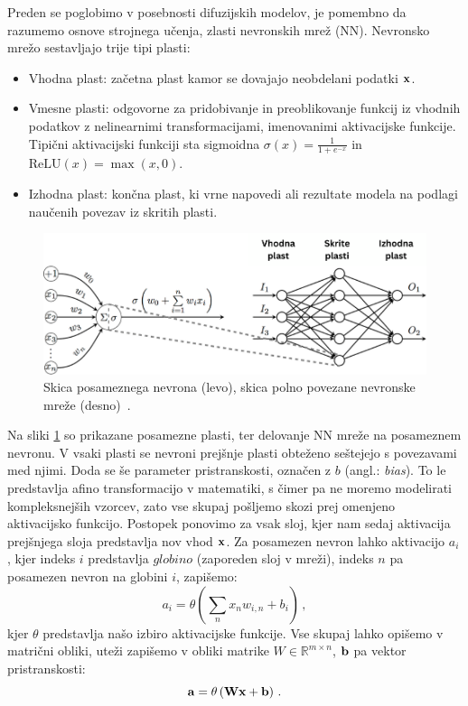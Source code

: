 \documentclass[12pt, a4paper]{article}
\begin{document}
Preden se poglobimo v posebnosti difuzijskih modelov, je pomembno da razumemo osnove strojnega učenja, zlasti nevronskih mrež (NN). Nevronsko mrežo sestavljajo trije tipi plasti:
\begin{itemize}
    \item Vhodna plast: začetna plast kamor se dovajajo neobdelani podatki $\bf{x}$.
    
    \item Vmesne plasti: odgovorne za pridobivanje in preoblikovanje funkcij iz vhodnih podatkov z nelinearnimi transformacijami, imenovanimi aktivacijske funkcije. Tipični aktivacijski funkciji sta sigmoidna $\sigma(x) = \frac{1}{1 + e^{-x}}$ in $\text{ReLU}(x) = \max({x, 0})$.
    
    \item Izhodna plast: končna plast, ki vrne napovedi ali rezultate modela na podlagi naučenih povezav iz skritih plasti.
\end{itemize}

\begin{figure}[htb!]
        \centering
        \includegraphics[width=0.8\linewidth]{Images_SLO/Neural Network_SLO.png}
        \caption{Skica posameznega nevrona (levo), skica polno povezane nevronske mreže (desno)~\cite{PetarV}.}
        \label{fig:NN}
\end{figure}

Na sliki \ref{fig:NN} so prikazane posamezne plasti, ter delovanje NN mreže na posameznem nevronu. V vsaki plasti se nevroni prejšnje plasti obteženo seštejejo s povezavami med njimi. Doda se še parameter pristranskosti, označen z $b$ (angl.: \textit{bias}). To le predstavlja afino transformacijo v matematiki, s čimer pa ne moremo modelirati kompleksnejših vzorcev, zato vse skupaj pošljemo skozi prej omenjeno aktivacijsko funkcijo. Postopek ponovimo za vsak sloj, kjer nam sedaj aktivacija prejšnjega sloja predstavlja nov vhod $\bf{x}$.
Za posamezen nevron lahko aktivacijo $a_i$, kjer indeks $i$ predstavlja $globino$ (zaporeden sloj v mreži), indeks $n$ pa posamezen nevron na globini $i$, zapišemo:
\begin{equation}
    a_i = \theta\left(\sum_{n} x_n w_{i,n} + b_i \right)\,,
\end{equation}
kjer $\theta$ predstavlja našo izbiro aktivacijske funkcije.
Vse skupaj lahko opišemo v matrični obliki, uteži zapišemo v obliki matrike $W \in \mathbb{R}^{m\times n}$, $\bf{ b}$ pa vektor pristranskosti:
\begin{equation}
    \bf{a} = \theta\left(W\bf{x} + \bf{b}\right)\,.
\end{equation}
\end{document}

